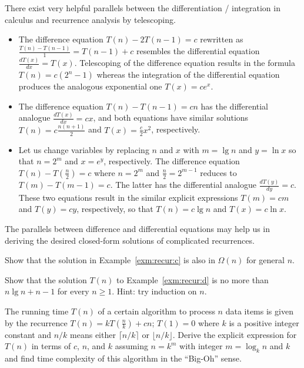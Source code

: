 There exist very helpful parallels between the
differentiation / integration in calculus and 
recurrence analysis by telescoping.
\begin{itemize}
\item The difference equation $T(n)- 2 T(n-1)= c$ 
rewritten as $\frac{T(n)-T(n-1)}{1} = T(n-1) + c$
resembles the differential equation $\frac{dT(x)}{dx} = T(x)$. 
Telescoping of the difference equation results in
the formula $T(n) = c(2^{n}-1)$ whereas the
integration of the differential equation produces the analogous 
exponential one $T(x) = c e^{x}$.
\item The difference equation  $T(n)-T(n-1)= c  n$  has the
differential analogue $\frac{dT(x)}{dx} = cx$, and both
equations have similar solutions $T(n) = c\frac{n(n+1)}{2}$ and
$T(x) = \frac{c}{2}x^{2}$, respectively.
\item 
Let us change variables
by replacing $n$ and $x$ with $m = \lg n$ and
$y = \ln x$ so that $n=2^{m}$ and $x=e^{y}$, 
respectively. The difference equation $T(n)-T(\frac{n}{2})= c $ 
where $n = 2^{m}$ and $\frac{n}{2} = 2^{m-1}$ reduces to
$T(m)-T(m-1) = c $. The latter
has the differential analogue $\frac{dT(y)}{dy} = c $. These
two equations result in the similar explicit expressions 
$T(m) = cm$ and $T(y) = cy$, respectively, so that
$T(n) = c\lg n$ and $T(x) = c \ln x$. 
\end{itemize}
The parallels between  difference and differential equations
may help us in deriving the desired closed-form
solutions of complicated recurrences.


\begin{Exercise}\label{exr:rec-low-bound}
Show that the solution in Example~\ref{exm:recur:c} is also in $\Omega(n)$ 
for general $n$.

\end{Exercise}

\begin{Exercise} \label{exr:rec-mergesort} 
Show that the solution $T(n)$ to Example~\ref{exm:recur:d} is no more than 
$n\lg n + n - 1$ for every $n\geq 1$. Hint: try induction on $n$.
\end{Exercise}

\begin{Exercise}\label{exr:recur:cn}
The running time $T(n)$ of a certain algorithm to process $n$ data items
is given by the recurrence
\(T(n) = kT \left ( \frac{n}{k} \right ) + c n\);
\(T(1) = 0\)
where $k$ is a positive integer constant and $n/k$ means either 
$\lceil n/k \rceil$ or $\lfloor n/k \rfloor$.
Derive the explicit expression
for $T(n)$ in terms of $c$, $n$, and $k$ assuming
$n = k^{m}$ with integer $m= \log_{k}n$ and $k$ and 
find time 
complexity of this algorithm in the ``Big-Oh'' sense. 
\end{Exercise}

